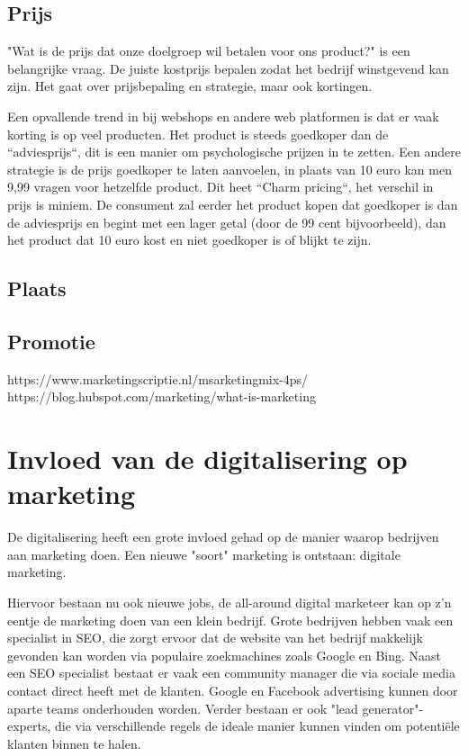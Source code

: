 \subsection{Prijs}
\label{sec:marketing-prijs}
"Wat is de prijs dat onze doelgroep wil betalen voor ons product?" is een belangrijke vraag. De juiste kostprijs bepalen zodat het bedrijf winstgevend kan zijn. Het gaat over prijsbepaling en strategie, maar ook kortingen.

Een opvallende trend in bij webshops en andere web platformen is dat er vaak korting is op veel producten. Het product is steeds goedkoper dan de ``adviesprijs``, dit is een manier om psychologische prijzen in te zetten. Een andere strategie is de prijs goedkoper te laten aanvoelen, in plaats van 10 euro kan men 9,99 vragen voor hetzelfde product. Dit heet ``Charm pricing``, het verschil in prijs is miniem. De consument zal eerder het product kopen dat goedkoper is dan de adviesprijs en begint met een lager getal (door de 99 cent bijvoorbeeld), dan het product dat 10 euro kost en niet goedkoper is of blijkt te zijn.

\subsection{Plaats}
\label{sec:marketing-plaats}


\subsection{Promotie}
\label{sec:marketing-promotie}

https://www.marketingscriptie.nl/msarketingmix-4ps/
https://blog.hubspot.com/marketing/what-is-marketing

\section{Invloed van de digitalisering op marketing}
\label{sec:digitalisering-marketing}
De digitalisering heeft een grote invloed gehad op de manier waarop bedrijven aan marketing doen. Een nieuwe "soort" marketing is ontstaan: digitale marketing. 

Hiervoor bestaan nu ook nieuwe jobs, de all-around digital marketeer kan op z'n eentje de marketing doen van een klein bedrijf. Grote bedrijven hebben vaak een specialist in SEO, die zorgt ervoor dat de website van het bedrijf makkelijk gevonden kan worden via populaire zoekmachines zoals Google en Bing. Naast een SEO specialist bestaat er vaak een community manager die via sociale media contact direct heeft met de klanten. Google en Facebook advertising kunnen door aparte teams onderhouden worden. Verder bestaan er ook "lead generator"-experts, die via verschillende regels de ideale manier kunnen vinden om potentiële klanten binnen te halen.

